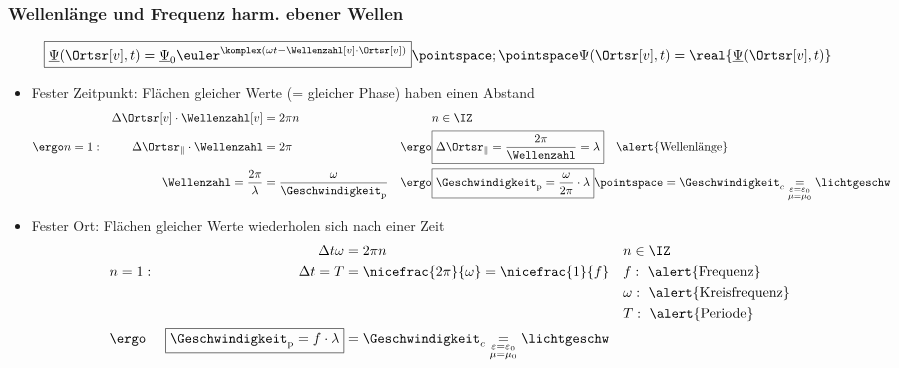 \begin{frame}
  \frametitle{Wellenlänge und Frequenz harm. ebener Wellen}
    \begin{equation*}
      \boxed{\underline{\Psi}(\Ortsr[v], t) = \underline{\Psi}_0 \euler^{\komplex(\omega t -\Wellenzahl[v] \cdot \Ortsr[v])} }\pointspace ; \pointspace \Psi(\Ortsr[v], t) = \real{\underline{\Psi}(\Ortsr[v], t)}
      \end{equation*}
  \begin{itemize}[<+->]
  \item \alert{Fester Zeitpunkt}: Flächen gleicher Werte (= gleicher Phase) haben einen Abstand
    \begin{align*}
&&\Delta\Ortsr[v]\cdot\Wellenzahl[v] &= 2\pi n &&n\in\IZ\\
\ergo &n = 1 : &\Delta\Ortsr_\Vert \cdot \Wellenzahl &= 2\pi &\ergo &\boxed{\Delta \Ortsr_\Vert = \frac{2\pi}{\Wellenzahl} =\lambda}\quad \text{\alert{Wellenlänge}}\\
&& \Wellenzahl = \frac{2\pi}{\lambda}&= \frac{\omega}{\Geschwindigkeit_{\mathrm{p}}} &\ergo&\boxed{\Geschwindigkeit_{\mathrm{p}}=\frac{\omega}{2\pi}\cdot \lambda}\pointspace = \Geschwindigkeit_{c} \underset{\substack{\varepsilon = \varepsilon_0 \\ \mu = \mu_0}}{=} \lichtgeschw
\end{align*}
\item \alert{Fester Ort}: Flächen gleicher Werte wiederholen sich nach einer Zeit
\begin{align*}
&&\Delta t \omega &= 2\pi  n && n\in \IZ\\
& n=1: &\Delta t = T &= \nicefrac{2\pi}{\omega} = \nicefrac{1}{f}&&
f:\text{ \alert{Frequenz}}\\
&&&&&\omega:\text{ \alert{Kreisfrequenz}}\\
&&&&&T:\text{ \alert{Periode}}\\
&\ergo & \boxed{\Geschwindigkeit_{\mathrm{p}}= f \cdot \lambda}&= \Geschwindigkeit_{c}\underset{\substack{\varepsilon = \varepsilon_0 \\ \mu = \mu_0}}{=} \lichtgeschw
\end{align*}
  \end{itemize}
\end{frame}


